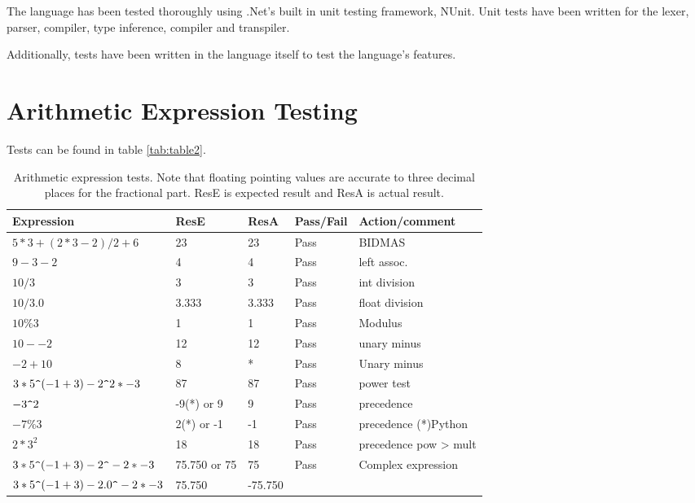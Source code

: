 The language has been tested thoroughly using .Net's built in unit testing framework, NUnit.
Unit tests have been written for the lexer, parser, compiler, type inference, compiler and transpiler.

Additionally, tests have been written in the language itself to test the language's features.

\section{Arithmetic Expression Testing}\label{sec:arithmetic-expression-testing}

Tests can be found in table \ref{tab:table2}.

\begin{table}[h]
    \caption{Arithmetic expression tests. Note that floating pointing values are accurate to three decimal places for the fractional part. ResE is expected result and ResA is actual result. \\}
    \begin{tabular}{|p{1.8in}|p{0.5in}|p{0.4in}|p{0.6in}|p{1.4in}|} \hline
    Expression & ResE & ResA& Pass/Fail & Action/comment \\ \hline \hline
    $5*3+(2*3-2)/2+6$ & 23 & 23 & Pass & BIDMAS \\ \hline
    $9-3-2$ & 4 & 4 & Pass & left assoc.\  \\ \hline
    $10 / 3$ & 3 & 3 & Pass & int division  \\ \hline
    $10 / 3.0$ & 3.333 & 3.333 & Pass & float division \\ \hline
    $10\%3$ & 1 & 1 & Pass & Modulus \\ \hline
    $10 - -2$ & 12 & 12 & Pass & unary minus\\ \hline
    $-2 + 10$ & 8 & * & Pass & Unary minus \\ \hline
    $3*5\verb|^|(-1+3)-2\verb|^|2*-3$ & 87 & 87 & Pass & power test \\ \hline
    $-3\verb|^|2$ & -9(*) or 9 & 9 & Pass & precedence \\ \hline
    $-7\%3$ & 2(*) or -1 & -1 & Pass & precedence (*)Python\\ \hline
    $2*3^2$ & 18 & 18 & Pass & precedence pow > mult \\ \hline
    $3*5\verb|^|(-1+3)-2\verb|^|-2*-3$ & 75.750 or 75 & 75 & Pass & Complex expression \\ \hline
    $3*5\verb|^|(-1+3)-2.0\verb|^|-2*-3$ & 75.750 & -75.750 & & \\ \hline

\end{tabular}
\end{table}
